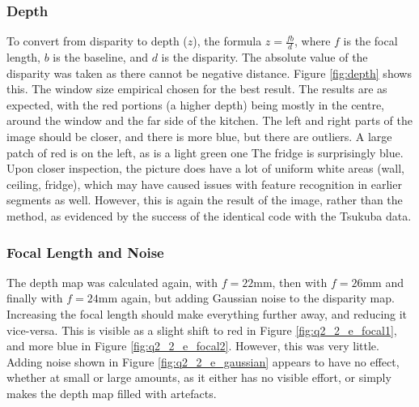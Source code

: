 \documentclass[a4paper, 10pt, conference]{ieeeconf}
\begin{document}
\subsubsection{Depth}
To convert from disparity to depth ($z$), the formula $z = \frac{fb}{d}$, where $f$ is the focal length, $b$ is the baseline, and $d$ is the disparity. The absolute value of the disparity was taken as there cannot be negative distance. Figure \ref{fig:depth} shows this. The window size empirical chosen for the best result. The results are as expected, with the red portions (a higher depth) being mostly in the centre, around the window and the far side of the kitchen. The left and right parts of the image should be closer, and there is more blue, but there are outliers. A large patch of red is on the left, as is a light green one The fridge is surprisingly blue. Upon closer inspection, the picture does have a lot of uniform white areas (wall, ceiling, fridge), which may have caused issues with feature recognition in earlier segments as well. However, this is again the result of the image, rather than the method, as evidenced by the success of the identical code with the Tsukuba data.

\subsubsection{Focal Length and Noise}

The depth map was calculated again, with $f = 22\text{mm}$, then with $f = 26\text{mm}$ and finally with $f = 24\text{mm}$ again, but adding Gaussian noise to the disparity map. Increasing the focal length should make everything further away, and reducing it vice-versa. This is visible as a slight shift to red in Figure \ref{fig:q2_2_e_focal1}, and more blue in Figure \ref{fig:q2_2_e_focal2}. However, this was very little. Adding noise shown in Figure \ref{fig:q2_2_e_gaussian} appears to have no effect, whether at small or large amounts, as it either has no visible effort, or simply makes the depth map filled with artefacts.
\end{document}
